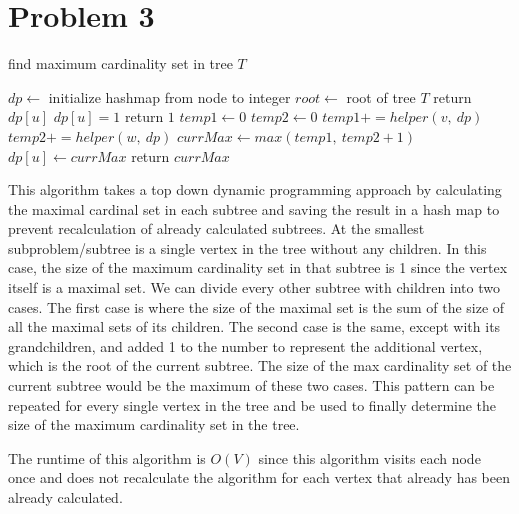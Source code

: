 \documentclass[12pt]{article}
\begin{document}
\newpage
\section*{Problem 3}
\begin{algorithm}
\caption{find maximum cardinality set in tree $T$}
\begin{algorithmic}
    \State $dp \gets $ initialize hashmap from node to integer
    \State $root \gets $ root of tree $T$
\EndFunction
\State
{}
        \State return $dp[u]$
    \EndIf
        \State $dp[u] = 1$
        \State return $1$
    \EndIf
    \State
    \State $temp1 \gets 0$
    \State $temp2 \gets 0$
        \State $temp1 += helper(v,\ dp)$
            \State $temp2 += helper(w,\ dp)$
        \EndFor
    \EndFor
    \State $currMax \gets max(temp1,\ temp2 + 1)$
    \State $dp[u] \gets currMax$
    \State return $currMax$
\EndFunction
\end{algorithmic}
\end{algorithm}

This algorithm takes a top down dynamic programming approach by calculating the maximal cardinal 
set in each subtree and saving the result in a hash map to prevent recalculation of already calculated 
subtrees. At the smallest subproblem/subtree is a single vertex in the tree without any children. 
In this case, the size of the maximum cardinality set in that subtree is 1 since the vertex itself is 
a maximal set. We can divide every other subtree with children into two cases. The first case is where the 
size of the maximal set is the sum of the size of all the maximal sets of its children. The second case is 
the same, except with its grandchildren, and added 1 to the number to represent the additional vertex, 
which is the root of the current subtree. The size of the max cardinality set of the current subtree would 
be the maximum of these two cases. This pattern can be repeated for every single vertex in the tree and be 
used to finally determine the size of the maximum cardinality set in the tree.
\newline

The runtime of this algorithm is $O(V)$ since this algorithm visits each node once and does not recalculate
the algorithm for each vertex that already has been already calculated.

\newpage
\end{document}

